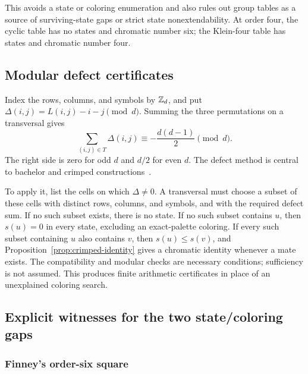 \documentclass[aps,pra,reprint,superscriptaddress,longbibliography,nofootinbib,floatfix,10pt]{revtex4-2}
\theoremstyle{definition}\newtheorem{definition}[theorem]{Definition}
\theoremstyle{remark}\newtheorem{remark}[theorem]{Remark}
\begin{document}
This avoids a state or coloring enumeration and also rules out group tables as a source of surviving-state gaps or strict state nonextendability. At order four, the cyclic table has no states and chromatic number six; the Klein-four table has states and chromatic number four.

\subsection{Modular defect certificates}\label{sec:delta}

Index the rows, columns, and symbols by $\mathbb Z_d$, and put $\Delta(i,j)=L(i,j)-i-j\pmod d$. Summing the three permutations on a transversal gives
\begin{equation}\label{eq:delta-certificate}
\sum_{(i,j)\in T}\Delta(i,j)
\equiv-\frac{d(d-1)}2\pmod d.
\end{equation}
The right side is zero for odd $d$ and $d/2$ for even $d$. The defect method is central to bachelor and crimped constructions~\cite{wanlesswebb2006bachelor,danziger2011monogamous}.

To apply it, list the cells on which $\Delta\ne0$. A transversal must choose a subset of these cells with distinct rows, columns, and symbols, and with the required defect sum. If no such subset exists, there is no state. If no such subset contains $u$, then $s(u)=0$ in every state, excluding an exact-palette coloring. If every such subset containing $u$ also contains $v$, then $s(u)\le s(v)$, and Proposition~\ref{prop:crimped-identity} gives a chromatic identity whenever a mate exists. The compatibility and modular checks are necessary conditions; sufficiency is not assumed. This produces finite arithmetic certificates in place of an unexplained coloring search.

\subsection{Explicit witnesses for the two state/coloring gaps}\label{sec:finite-regimes}

\subsubsection{Finney's order-six square}
\end{document}
